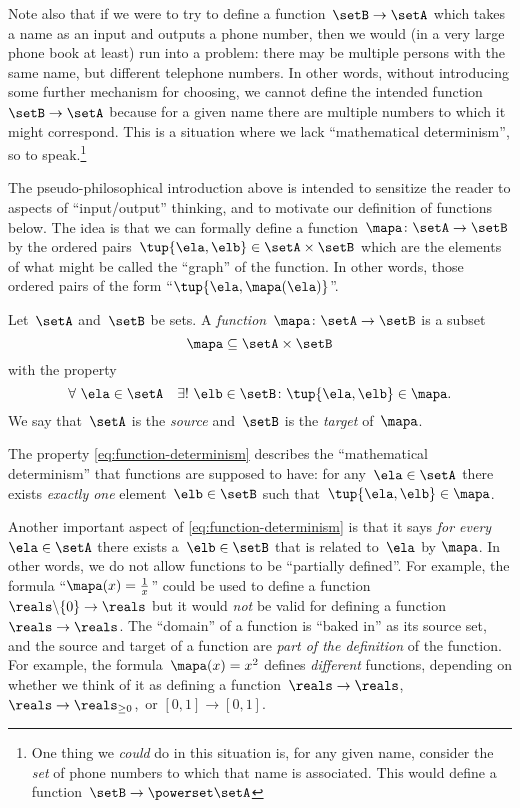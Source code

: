 Note also that if we were to try to define a function~$\setB \to \setA$ which takes a name as an input and outputs a phone number, then we would (in a very large phone book at least) run into a problem: there may be multiple persons with the same name, but different telephone numbers.
In other words, without introducing some further mechanism for choosing, we cannot define the intended function~$\setB \to \setA$ because for a given name there are multiple numbers to which it might correspond.
This is a situation where we lack ``mathematical determinism'', so to speak.\footnote{One thing we \emph{could} do in this situation is, for any given name, consider the \emph{set} of phone numbers to which that name is associated.
This would define a function~$\setB \to \powerset \setA$}

The pseudo-philosophical introduction above is intended to sensitize the reader to aspects of ``input/output'' thinking, and to motivate our definition of functions below.
The idea is that we can formally define a function~$\mapa\colon \setA \to \setB$ by the ordered pairs~$\tup{\ela, \elb} \in \setA \times \setB$ which are the elements of what might be called the ``graph'' of the function.
In other words, those ordered pairs of the form ``$\tup{\ela, \mapa(\ela)}$''.

\begin{definition}
    \label{def:function}
Let~$\setA$ and~$\setB$ be sets. A \emph{function}~$\mapa\colon \setA \to \setB$ is a subset
\begin{equation*}
\mapa \subseteq \setA \times \setB
\end{equation*}
with the property
\begin{equation}
    \label{eq:function-determinism}
\forall \ \ela \in \setA  \quad  \exists ! \ \elb \in \setB \colon \tup{\ela,\elb} \in \mapa.
\end{equation}
We say that~$\setA$ is the \emph{source} and~$\setB$ is the \emph{target} of~$\mapa$.
\end{definition}

The property \cref{eq:function-determinism} describes the ``mathematical determinism'' that functions are supposed to have:
for any~$\ela \in \setA$ there exists \emph{exactly one} element~$\elb \in \setB$ such that~$\tup{\ela, \elb} \in \mapa$.

Another important aspect of \cref{eq:function-determinism} is that it says \emph{for every}~$\ela \in \setA$ there exists a~$\elb \in \setB$ that is related to~$\ela$ by $\mapa$.
In other words, we do not allow functions to be ``partially defined''.
For example, the formula ``$\mapa(x) = \frac{1}{x}$'' could be used to define a function~$\reals \backslash \{ 0 \} \to \reals$ but it would \emph{not} be valid for defining a function~$\reals \to \reals$.
The ``domain'' of a function is ``baked in'' as its source set, and the source and target of a function are \emph{part of the definition} of the function. For example, the formula~$\mapa(x) = x^2$ defines \emph{different} functions, depending on whether we think of it as defining a function~$\reals \to \reals$,~$\reals \to \reals_{\geq 0}$,~or $[0,1] \to [0,1]$.


